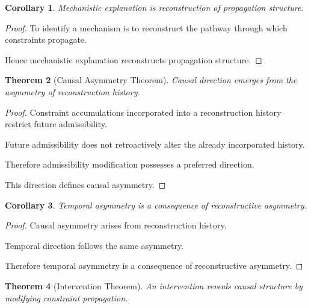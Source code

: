 \documentclass[12pt,oneside]{article}
\newtheorem{theorem}{Theorem}[section] \newtheorem{lemma}[theorem]{Lemma} \newtheorem{proposition}[theorem]{Proposition} \newtheorem{corollary}[theorem]{Corollary}
\theoremstyle{definition}
\begin{document}
\begin{corollary}

Mechanistic explanation is reconstruction of propagation structure.

\end{corollary}

\begin{proof}

To identify a mechanism is to reconstruct the pathway through which constraints propagate.

Hence mechanistic explanation reconstructs propagation structure.

\end{proof}

\begin{theorem}[Causal Asymmetry Theorem]

Causal direction emerges from the asymmetry of reconstruction history.

\end{theorem}

\begin{proof}

Constraint accumulations incorporated into a reconstruction history restrict future admissibility.

Future admissibility does not retroactively alter the already incorporated history.

Therefore admissibility modification possesses a preferred direction.

This direction defines causal asymmetry.

\end{proof}

\begin{corollary}

Temporal asymmetry is a consequence of reconstructive asymmetry.

\end{corollary}

\begin{proof}

Causal asymmetry arises from reconstruction history.

Temporal direction follows the same asymmetry.

Therefore temporal asymmetry is a consequence of reconstructive asymmetry.

\end{proof}

\begin{theorem}[Intervention Theorem]

An intervention reveals causal structure by modifying constraint propagation.

\end{theorem}
\end{document}
